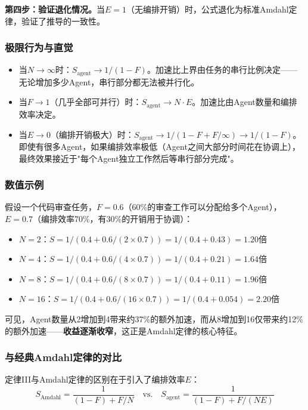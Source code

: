 \textbf{第四步：验证退化情况。}当$E = 1$（无编排开销）时，公式退化为标准Amdahl定律，验证了推导的一致性。

\subsubsection{极限行为与直觉}

\begin{itemize}[nosep]
\item 当$N \to \infty$时：$S_{\mathrm{agent}} \to 1/(1-F)$。加速比上界由任务的串行比例决定——无论增加多少Agent，串行部分都无法被并行化。
\item 当$F \to 1$（几乎全部可并行）时：$S_{\mathrm{agent}} \to N \cdot E$。加速比由Agent数量和编排效率决定。
\item 当$E \to 0$（编排开销极大）时：$S_{\mathrm{agent}} \to 1/(1-F+F/\infty) \to 1/(1-F)$。即使有很多Agent，如果编排效率极低（Agent之间大部分时间花在协调上），最终效果接近于"每个Agent独立工作然后等串行部分完成"。
\end{itemize}

\subsubsection{数值示例}

假设一个代码审查任务，$F = 0.6$（60\%的审查工作可以分配给多个Agent），$E = 0.7$（编排效率70\%，有30\%的开销用于协调）：

\begin{itemize}[nosep]
\item $N = 2$：$S = 1/(0.4 + 0.6/(2 \times 0.7)) = 1/(0.4 + 0.43) = 1.20$倍
\item $N = 4$：$S = 1/(0.4 + 0.6/(4 \times 0.7)) = 1/(0.4 + 0.21) = 1.64$倍
\item $N = 8$：$S = 1/(0.4 + 0.6/(8 \times 0.7)) = 1/(0.4 + 0.11) = 1.96$倍
\item $N = 16$：$S = 1/(0.4 + 0.6/(16 \times 0.7)) = 1/(0.4 + 0.054) = 2.20$倍
\end{itemize}

可见，Agent数量从2增加到4带来约37\%的额外加速，而从8增加到16仅带来约12\%的额外加速——\textbf{收益逐渐收窄}，这正是Amdahl定律的核心特征。

\subsubsection{与经典Amdahl定律的对比}

定律III与Amdahl定律的区别在于引入了编排效率$E$：
\begin{equation}
S_{\mathrm{Amdahl}} = \frac{1}{(1-F) + F/N} \quad \text{vs.} \quad S_{\mathrm{agent}} = \frac{1}{(1-F) + F/(NE)}
\end{equation}


